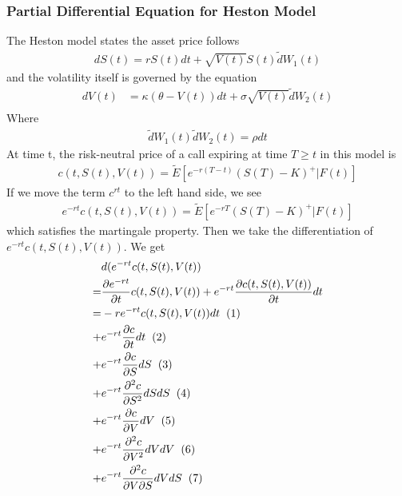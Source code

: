 \documentclass[a4paper]{article}
\begin{document}
\subsubsection{Partial Differential Equation for Heston Model} 
The Heston model states the asset price follows
\begin{align}
	dS(t) = rS(t)dt + \sqrt{V(t)} S(t) \tilde dW_1(t)
\end{align}
and the volatility itself is governed by the equation
\begin{align}
	dV(t) & = \kappa(\theta -V(t))dt + \sigma \sqrt{V(t)} \tilde dW_2(t) \\
\end{align}
Where 
\begin{align*}
	\tilde dW_1(t) \tilde dW_2(t) = \rho dt
\end{align*}
At time t, the risk-neutral price of a call expiring at time $T \geq t$ in this model is
\begin{align*}
	c(t, S(t), V(t)) = \tilde E[e^{-r(T-t)}(S(T)-K)^+|F(t)]
\end{align*}
If we move the term $c^{rt}$ to the left hand side, we see
\begin{align}
	e^{-rt}c(t, S(t), V(t)) = \tilde E[e^{-rT}(S(T)-K)^+|F(t)]
\end{align}
which satisfies the martingale property.
Then we take the differentiation of $e^{-rt}c(t, S(t), V(t))$. We get
\begin{align*}
	& d(e^{-rt}c(t, S(t), V(t))\\
	= & \frac{\partial e^{-rt}}{\partial t} c(t, S(t), V(t)) 
	+ e^{-rt}\frac{\partial c(t, S(t), V(t))}{\partial t} dt \\
	= & -re^{-rt}c(t, S(t),V(t))dt \hspace{2mm} (1)\\
	+ & e^{-rt} \frac{\partial c}{\partial t} dt \hspace{2mm} (2) \\
	+ & e^{-rt} \frac{\partial c}{\partial S} dS \hspace{2mm} (3) \\
	+ & e^{-rt} \frac{\partial^2 c}{\partial S^2} dS dS \hspace{2mm} (4)\\
	+ & e^{-rt} \frac{\partial c}{\partial V} dV \hspace{2mm} (5) \\
	+ & e^{-rt} \frac{\partial^2 c}{\partial V^2} dV dV\hspace{2mm} (6)\\
	+ & e^{-rt} \frac{\partial^2 c}{\partial V \partial S} dV dS\hspace{2mm} (7)
\end{align*}
\end{document}
